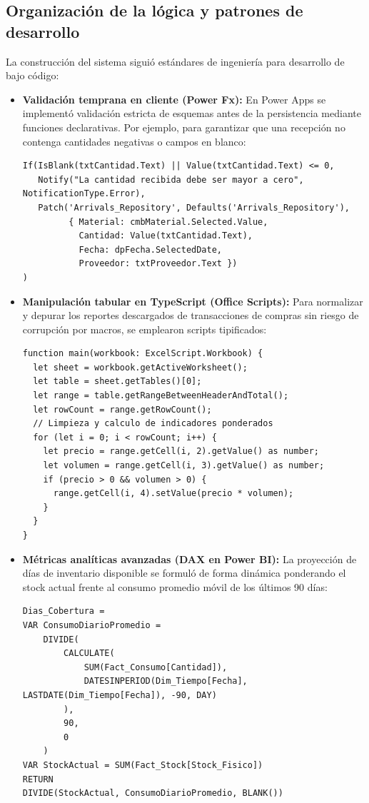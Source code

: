 \subsection{Organización de la lógica y patrones de desarrollo}

La construcción del sistema siguió estándares de ingeniería para desarrollo de bajo código:
\begin{itemize}
    \item \textbf{Validación temprana en cliente (Power Fx):} En Power Apps se implementó validación estricta de esquemas antes de la persistencia mediante funciones declarativas. Por ejemplo, para garantizar que una recepción no contenga cantidades negativas o campos en blanco:
\begin{lstlisting}[frame=single, backgroundcolor=\color{black!3}, rulecolor=\color{black!30}, basicstyle=\footnotesize\ttfamily, breaklines=true]
If(IsBlank(txtCantidad.Text) || Value(txtCantidad.Text) <= 0,
   Notify("La cantidad recibida debe ser mayor a cero", NotificationType.Error),
   Patch('Arrivals_Repository', Defaults('Arrivals_Repository'),
         { Material: cmbMaterial.Selected.Value,
           Cantidad: Value(txtCantidad.Text),
           Fecha: dpFecha.SelectedDate,
           Proveedor: txtProveedor.Text })
)
\end{lstlisting}
    \item \textbf{Manipulación tabular en TypeScript (Office Scripts):} Para normalizar y depurar los reportes descargados de transacciones de compras sin riesgo de corrupción por macros, se emplearon scripts tipificados:
\begin{lstlisting}[frame=single, backgroundcolor=\color{black!3}, rulecolor=\color{black!30}, basicstyle=\footnotesize\ttfamily, breaklines=true]
function main(workbook: ExcelScript.Workbook) {
  let sheet = workbook.getActiveWorksheet();
  let table = sheet.getTables()[0];
  let range = table.getRangeBetweenHeaderAndTotal();
  let rowCount = range.getRowCount();
  // Limpieza y calculo de indicadores ponderados
  for (let i = 0; i < rowCount; i++) {
    let precio = range.getCell(i, 2).getValue() as number;
    let volumen = range.getCell(i, 3).getValue() as number;
    if (precio > 0 && volumen > 0) {
      range.getCell(i, 4).setValue(precio * volumen);
    }
  }
}
\end{lstlisting}
    \item \textbf{Métricas analíticas avanzadas (DAX en Power BI):} La proyección de días de inventario disponible se formuló de forma dinámica ponderando el stock actual frente al consumo promedio móvil de los últimos 90 días:
\begin{lstlisting}[frame=single, backgroundcolor=\color{black!3}, rulecolor=\color{black!30}, basicstyle=\footnotesize\ttfamily, breaklines=true]
Dias_Cobertura = 
VAR ConsumoDiarioPromedio = 
    DIVIDE(
        CALCULATE(
            SUM(Fact_Consumo[Cantidad]), 
            DATESINPERIOD(Dim_Tiempo[Fecha], LASTDATE(Dim_Tiempo[Fecha]), -90, DAY)
        ),
        90,
        0
    )
VAR StockActual = SUM(Fact_Stock[Stock_Fisico])
RETURN
DIVIDE(StockActual, ConsumoDiarioPromedio, BLANK())
\end{lstlisting}
\end{itemize}

